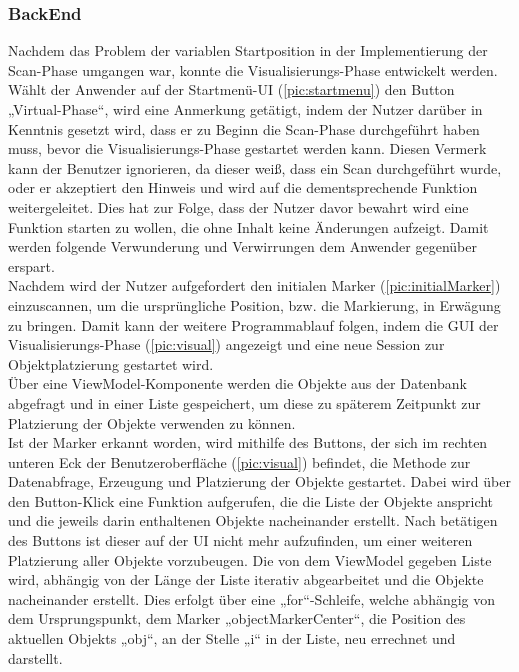 \subsubsection{BackEnd}
Nachdem das Problem der variablen Startposition in der Implementierung der Scan-Phase umgangen war, konnte die Visualisierungs-Phase entwickelt werden. 
\\ 
\linebreak
Wählt der Anwender auf der Startmenü-\acs{UI} (\ref{pic:startmenu}) den Button „Virtual-Phase“, wird eine Anmerkung getätigt, indem der Nutzer darüber in 
Kenntnis gesetzt wird, dass er zu Beginn die Scan-Phase durchgeführt haben muss, bevor die Visualisierungs-Phase gestartet werden kann. Diesen Vermerk kann der 
Benutzer ignorieren, da dieser weiß, dass ein Scan durchgeführt wurde, oder er akzeptiert den Hinweis und wird auf die dementsprechende Funktion weitergeleitet. 
Dies hat zur Folge, dass der Nutzer davor bewahrt wird eine Funktion starten zu wollen, die ohne Inhalt keine Änderungen aufzeigt. Damit werden folgende 
Verwunderung und Verwirrungen dem Anwender gegenüber erspart.
\\ 
Nachdem wird der Nutzer aufgefordert den initialen Marker (\ref{pic:initialMarker}) einzuscannen, um die ursprüngliche Position, bzw. die Markierung, in Erwägung 
zu bringen. Damit kann der weitere Programmablauf folgen, indem die \acs{GUI} der Visualisierungs-Phase (\ref{pic:visual}) angezeigt und eine neue Session zur 
Objektplatzierung gestartet wird. 
\\
Über eine ViewModel-Komponente werden die Objekte aus der Datenbank abgefragt und in einer Liste gespeichert, um diese zu späterem Zeitpunkt zur Platzierung der 
Objekte verwenden zu können. 
\\ 
Ist der Marker erkannt worden, wird mithilfe des Buttons, der sich im rechten unteren Eck der Benutzeroberfläche (\ref{pic:visual}) befindet, die Methode zur 
Datenabfrage, Erzeugung und Platzierung der Objekte gestartet. Dabei wird über den Button-Klick eine Funktion aufgerufen, die die Liste der Objekte anspricht und 
die jeweils darin enthaltenen Objekte nacheinander erstellt. Nach betätigen des Buttons ist dieser auf der \acs{UI} nicht mehr aufzufinden, um einer weiteren 
Platzierung aller Objekte vorzubeugen. Die von dem ViewModel gegeben Liste wird, abhängig von der Länge der Liste iterativ abgearbeitet und die Objekte 
nacheinander erstellt. Dies erfolgt über eine „for“-Schleife, welche abhängig von dem Ursprungspunkt, dem Marker „objectMarkerCenter“, die Position des 
aktuellen Objekts „obj“, an der Stelle „i“ in der Liste, neu errechnet und darstellt.

